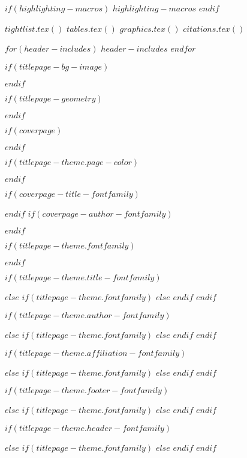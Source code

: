 $if(highlighting-macros)$
$highlighting-macros$
$endif$

$tightlist.tex()$
$tables.tex()$
$graphics.tex()$
$citations.tex()$

$for(header-includes)$
$header-includes$
$endfor$

\usepackage{hyphenat}
\usepackage{ifthen}
\usepackage{calc}
\usepackage{calculator}

$if(titlepage-bg-image)$
\usepackage{graphicx}
\usepackage{wallpaper}
$endif$

$if(titlepage-geometry)$
\usepackage{geometry}
$endif$

$if(coverpage)$
\usepackage{graphicx}
\usepackage{geometry}
\usepackage{afterpage}
\usepackage{tikz}
\usetikzlibrary{calc}
\usetikzlibrary{fadings}
\usepackage[pagecolor=none]{pagecolor}
$endif$

$if(titlepage-theme.page-color)$
\usepackage[pagecolor=none]{pagecolor}
$endif$

$if(coverpage-title-fontfamily)$
\usepackage{fontspec}
$endif$
$if(coverpage-author-fontfamily)$
\usepackage{fontspec}
$endif$

$if(titlepage-theme.fontfamily)$
\usepackage{fontspec}
$endif$

$if(titlepage-theme.title-fontfamily)$
\usepackage{fontspec}
$else$
$if(titlepage-theme.fontfamily)$
\newcommand{\titlepagetitlefont}{\titlepagefont}
$else$
\newcommand{\titlepagetitlefont}{}
$endif$
$endif$

$if(titlepage-theme.author-fontfamily)$
\usepackage{fontspec}
$else$
$if(titlepage-theme.fontfamily)$
\newcommand{\titlepageauthorfont}{\titlepagefont}
$else$
\newcommand{\titlepageauthorfont}{}
$endif$
$endif$

$if(titlepage-theme.affiliation-fontfamily)$
\usepackage{fontspec}
$else$
$if(titlepage-theme.fontfamily)$
\newcommand{\titlepageaffiliationfont}{\titlepagefont}
$else$
\newcommand{\titlepageaffiliationfont}{}
$endif$
$endif$

$if(titlepage-theme.footer-fontfamily)$
\usepackage{fontspec}
$else$
$if(titlepage-theme.fontfamily)$
\newcommand{\titlepagefooterfont}{\titlepagefont}
$else$
\newcommand{\titlepagefooterfont}{}
$endif$
$endif$

$if(titlepage-theme.header-fontfamily)$
\usepackage{fontspec}
$else$
$if(titlepage-theme.fontfamily)$
\newcommand{\titlepageheaderfont}{\titlepagefont}
$else$
\newcommand{\titlepageheaderfont}{}
$endif$
$endif$

